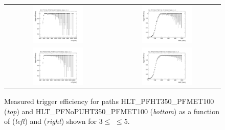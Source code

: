 \begin{figure}[!t]
  \centering
  \begin{tabular}{cc}
                \includegraphics[width=0.49\textwidth]{figures/turn_on_HT_TagEle27WP80_ProbePFHT350PFMET100_MHT200_chs_NJets3_5.png} &
                \includegraphics[width=0.49\textwidth]{figures/turn_on_MHT_TagEle27WP80_ProbePFHT350PFMET100_HT500_chs_NJets3_5.png} \\
                \includegraphics[width=0.49\textwidth]{figures/turn_on_HT_TagEle27WP80_ProbePFNoPUHT350PFMET100_MHT200_chs_NJets3_5.png} &
                \includegraphics[width=0.49\textwidth]{figures/turn_on_MHT_TagEle27WP80_ProbePFNoPUHT350PFMET100_HT500_chs_NJets3_5.png} \\
  \end{tabular}
\caption{Measured trigger efficiency for paths HLT\_PFHT350\_PFMET100 (\textit{top}) and HLT\_PFNoPUHT350\_PFMET100 (\textit{bottom}) as a function of \HT (\textit{left}) and \MHT (\textit{right}) shown for $3 \leq$ \NJets $\leq 5$.} 
  \label{fig:trig_eff_3njets5}
\end{figure}

